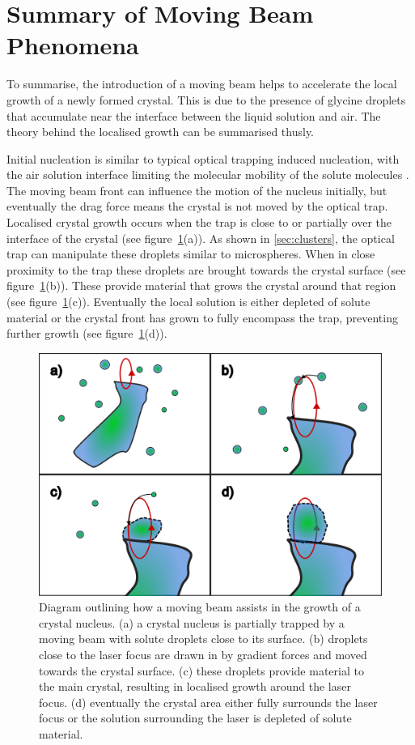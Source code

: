 \section{Summary of Moving Beam Phenomena}
To summarise, the introduction of a moving beam helps to accelerate the 
local growth of a newly formed crystal. This is due to the presence of 
glycine droplets that accumulate near the interface between the liquid 
solution and air. The theory behind the localised growth can be summarised 
thusly.

Initial nucleation is similar to typical optical trapping induced nucleation,
with the air solution interface limiting the molecular mobility of the solute
molecules \cite{Liao2022, Sugiyama2009, Gowayed2021}. The moving beam front 
can influence the motion of the nucleus initially, but eventually the drag 
force means the crystal is not moved by the optical trap. Localised crystal
growth occurs when the trap is close to or partially over the interface of 
the crystal (see figure~\ref{fig:local_nucleation}(a)). As shown in \ref{sec:clusters}, the optical trap can manipulate these droplets similar 
to microspheres. When in close proximity to the trap these droplets are 
brought towards the crystal surface (see figure~\ref{fig:local_nucleation}(b)). 
These provide material that grows the crystal around that region (see figure~\ref{fig:local_nucleation}(c)). Eventually the local solution is either 
depleted of solute material or the crystal front has grown to fully encompass 
the trap, preventing further growth (see figure~\ref{fig:local_nucleation}(d)). 
\begin{figure}[h!]
	\centering
	\includegraphics[width=0.8\linewidth]{galvano_diagram.pdf}
	\caption{Diagram outlining how a moving beam assists in the growth of a crystal
		nucleus. (a) a crystal nucleus is partially trapped by a moving beam with 
		solute droplets close to its surface. (b) droplets close to the laser
		focus are drawn in by gradient forces and moved towards the crystal surface.
		(c) these droplets provide material to the main crystal, resulting in
		localised growth around the laser focus. (d) eventually the crystal area 
		either fully surrounds the laser focus or the solution surrounding the laser
		is depleted of solute material.}
	\label{fig:local_nucleation}
\end{figure}

